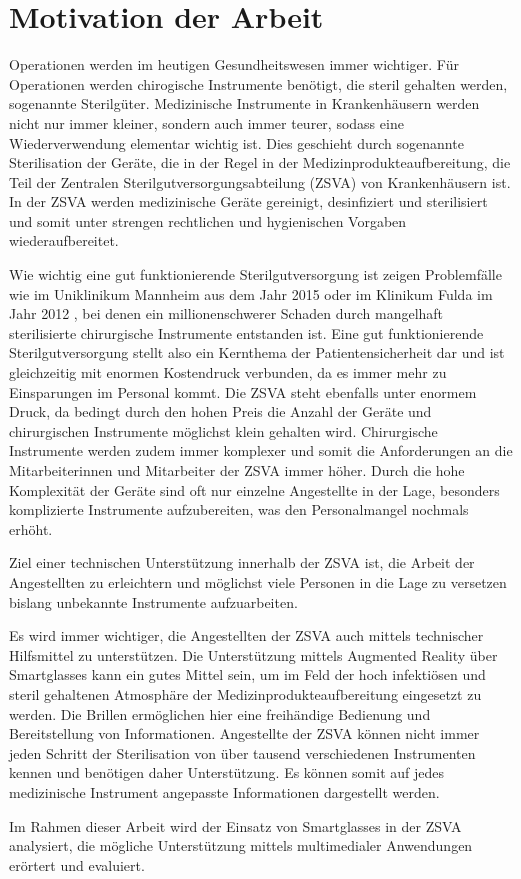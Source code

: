 \section{Motivation der Arbeit}
Operationen werden im heutigen Gesundheitswesen immer wichtiger. Für Operationen werden chirogische Instrumente benötigt, die steril gehalten werden, sogenannte Sterilgüter.
Medizinische Instrumente in Krankenhäusern werden nicht nur immer kleiner, sondern auch immer teurer, sodass eine Wiederverwendung elementar wichtig ist. Dies geschieht durch sogenannte Sterilisation der Geräte, die in der Regel in der Medizinprodukteaufbereitung, die Teil der Zentralen Sterilgutversorgungsabteilung (ZSVA) von Krankenhäusern ist. In der ZSVA werden medizinische Geräte gereinigt, desinfiziert und sterilisiert und somit unter strengen rechtlichen und hygienischen Vorgaben wiederaufbereitet. 

Wie wichtig eine gut funktionierende Sterilgutversorgung ist zeigen Problemfälle wie im Uniklinikum Mannheim \cite{Brandt2015} aus dem Jahr 2015 oder im Klinikum Fulda im Jahr 2012 \cite{HygieneFuldar2012}, bei denen ein millionenschwerer Schaden durch mangelhaft sterilisierte chirurgische Instrumente entstanden ist. Eine gut funktionierende Sterilgutversorgung stellt also ein Kernthema der Patientensicherheit dar und ist gleichzeitig mit enormen Kostendruck verbunden, da es immer mehr zu Einsparungen im Personal kommt. Die ZSVA steht ebenfalls unter enormem Druck, da bedingt durch den hohen Preis die Anzahl der Geräte und chirurgischen Instrumente möglichst klein gehalten wird. Chirurgische Instrumente werden zudem immer komplexer und somit die Anforderungen an die Mitarbeiterinnen und Mitarbeiter der ZSVA immer höher. Durch die hohe Komplexität der Geräte sind oft nur einzelne Angestellte in der Lage, besonders komplizierte Instrumente aufzubereiten, was den Personalmangel nochmals erhöht.

Ziel einer technischen Unterstützung innerhalb der ZSVA ist, die Arbeit der Angestellten zu erleichtern und möglichst viele Personen in die Lage zu versetzen bislang unbekannte Instrumente aufzuarbeiten.

Es wird immer wichtiger, die Angestellten der ZSVA auch mittels technischer Hilfsmittel zu unterstützen. Die Unterstützung mittels Augmented Reality über Smartglasses kann ein gutes Mittel sein, um im Feld der hoch infektiösen und steril gehaltenen Atmosphäre der Medizinprodukteaufbereitung eingesetzt zu werden. Die Brillen ermöglichen hier eine freihändige Bedienung und Bereitstellung von Informationen. Angestellte der ZSVA können nicht immer jeden Schritt der Sterilisation von über tausend verschiedenen Instrumenten kennen und benötigen daher Unterstützung. Es können somit auf jedes medizinische Instrument angepasste Informationen dargestellt werden. 

Im Rahmen dieser Arbeit wird der Einsatz von Smartglasses in der ZSVA analysiert, die mögliche Unterstützung mittels multimedialer Anwendungen erörtert und evaluiert. 